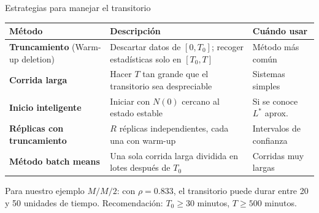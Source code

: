 \documentclass[aspectratio=1610, 9pt]{beamer}
\begin{document}
\begin{frame}{Estrategias para manejar el transitorio}

\renewcommand{\arraystretch}{1.4}
\begin{center}
\begin{tabular}{p{3.8cm}p{4.5cm}p{3.5cm}}
\toprule
\textbf{Método} & \textbf{Descripción} & \textbf{Cuándo usar} \\
\midrule
\textbf{Truncamiento} (Warm-up deletion) & Descartar datos de $[0, T_0]$; recoger estadísticas solo en $[T_0, T]$ & Método más común \\
\textbf{Corrida larga} & Hacer $T$ tan grande que el transitorio sea despreciable & Sistemas simples \\
\textbf{Inicio inteligente} & Iniciar con $N(0)$ cercano al estado estable & Si se conoce $L^*$ aprox. \\
\textbf{Réplicas con truncamiento} & $R$ réplicas independientes, cada una con warm-up & Intervalos de confianza \\
\textbf{Método batch means} & Una sola corrida larga dividida en lotes después de $T_0$ & Corridas muy largas \\
\bottomrule
\end{tabular}
\end{center}

\vspace{0.3cm}
Para nuestro ejemplo $M/M/2$: con $\rho = 0.833$, el transitorio puede durar entre 20 y 50 unidades de tiempo. Recomendación: $T_0 \geq 30$ minutos, $T \geq 500$ minutos.
\end{frame}
\end{document}
